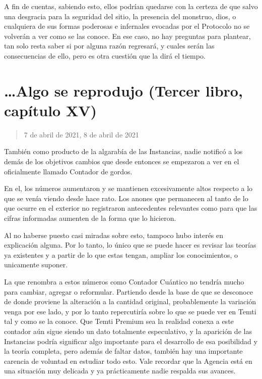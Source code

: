 \documentclass[
  spanish,
]{book}
\begin{document}
A fin de cuentas, sabiendo esto, ellos podrían quedarse con la certeza de que salvo una desgracia para la seguridad del sitio, la presencia del monstruo, dios, o cualquiera de sus formas poderosas e infernales evocadas por el Protocolo no se volverán a ver como se las conoce. En ese caso, no hay preguntas para plantear, tan solo resta saber si por alguna razón regresará, y cuales serán las consecuencias de ello, pero es otra cuestión que la dirá el tiempo.

\hypertarget{algo-se-reprodujo-tercer-libro-capuxedtulo-xv}{%
\section{\ldots Algo se reprodujo (Tercer libro, capítulo XV)}\label{algo-se-reprodujo-tercer-libro-capuxedtulo-xv}}

\begin{quote}
7 de abril de 2021, 8 de abril de 2021
\end{quote}

También como producto de la algarabía de las Instancias, nadie notificó a los demás de los objetivos cambios que desde entonces se empezaron a ver en el oficialmente llamado Contador de gordos.

En el, los números aumentaron y se mantienen excesivamente altos respecto a lo que se venía viendo desde hace rato. Los anones que permanecen al tanto de lo que ocurre en el exterior no registraron antecedentes relevantes como para que las cifras informadas aumenten de la forma que lo hicieron.

Al no haberse puesto casi miradas sobre esto, tampoco hubo interés en explicación alguna. Por lo tanto, lo único que se puede hacer es revisar las teorías ya existentes y a partir de lo que estas tengan, ampliar los conocimientos, o unicamente suponer.

La que renombra a estos números como Contador Cuántico no tendría mucho para cambiar, agregar o reformular. Partiendo desde la base de que se desconoce de donde proviene la alteración a la cantidad original, probablemente la variación venga por ese lado, y por lo tanto repercutiría sobre lo que se puede ver en Temti tal y como se la conoce. Que Temti Premium sea la realidad conexa a este contador aún sigue siendo un dato totalmente especulativo, y la aparición de las Instancias podría significar algo importante para el desarrollo de esa posibilidad y la teoría completa, pero además de faltar datos, también hay una importante carencia de voluntad en estudiar todo esto. Vale recordar que la Agencia está en una situación muy delicada y ya prácticamente nadie respalda sus avances.
\end{document}
